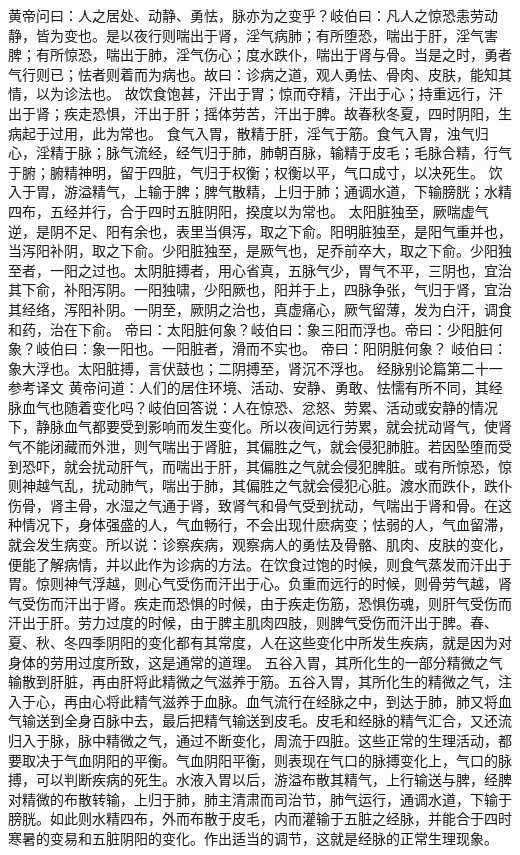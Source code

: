 \documentclass[a4paper,12pt,UTF8,twoside]{ctexbook}
\begin{document}
黄帝问曰：人之居处、动静、勇怯，脉亦为之变乎？岐伯曰：凡人之惊恐恚劳动静，皆为变也。是以夜行则喘出于肾，淫气病肺；有所堕恐，喘出于肝，淫气害脾；有所惊恐，喘出于肺，淫气伤心；度水跌仆，喘出于肾与骨。当是之时，勇者气行则已；怯者则着而为病也。故曰：诊病之道，观人勇怯、骨肉、皮肤，能知其情，以为诊法也。
故饮食饱甚，汗出于胃；惊而夺精，汗出于心；持重远行，汗出于肾；疾走恐惧，汗出于肝；摇体劳苦，汗出于脾。故春秋冬夏，四时阴阳，生病起于过用，此为常也。
食气入胃，散精于肝，淫气于筋。食气入胃，浊气归心，淫精于脉；脉气流经，经气归于肺，肺朝百脉，输精于皮毛；毛脉合精，行气于腑；腑精神明，留于四脏，气归于权衡；权衡以平，气口成寸，以决死生。
饮入于胃，游溢精气，上输于脾；脾气散精，上归于肺；通调水道，下输膀胱；水精四布，五经并行，合于四时五脏阴阳，揆度以为常也。
太阳脏独至，厥喘虚气逆，是阴不足、阳有余也，表里当俱泻，取之下俞。阳明脏独至，是阳气重并也，当泻阳补阴，取之下俞。少阳脏独至，是厥气也，足乔前卒大，取之下俞。少阳独至者，一阳之过也。太阴脏搏者，用心省真，五脉气少，胃气不平，三阴也，宜治其下俞，补阳泻阴。一阳独啸，少阳厥也，阳并于上，四脉争张，气归于肾，宜治其经络，泻阳补阴。一阴至，厥阴之治也，真虚痛心，厥气留薄，发为白汗，调食和药，治在下俞。
帝曰：太阳脏何象？岐伯曰：象三阳而浮也。帝曰：少阳脏何象？岐伯曰：象一阳也。一阳脏者，滑而不实也。
帝曰：阳阴脏何象？
岐伯曰：象大浮也。太阳脏搏，言伏鼓也；二阴搏至，肾沉不浮也。
经脉别论篇第二十一参考译文
黄帝问道：人们的居住环境、活动、安静、勇敢、怯懦有所不同，其经脉血气也随着变化吗？岐伯回答说：人在惊恐、忿怒、劳累、活动或安静的情况下，静脉血气都要受到影响而发生变化。所以夜间远行劳累，就会扰动肾气，使肾气不能闭藏而外泄，则气喘出于肾脏，其偏胜之气，就会侵犯肺脏。若因坠堕而受到恐吓，就会扰动肝气，而喘出于肝，其偏胜之气就会侵犯脾脏。或有所惊恐，惊则神越气乱，扰动肺气，喘出于肺，其偏胜之气就会侵犯心脏。渡水而跌仆，跌仆伤骨，肾主骨，水湿之气通于肾，致肾气和骨气受到扰动，气喘出于肾和骨。在这种情况下，身体强盛的人，气血畅行，不会出现什麽病变；怯弱的人，气血留滞，就会发生病变。所以说：诊察疾病，观察病人的勇怯及骨骼、肌肉、皮肤的变化，便能了解病情，并以此作为诊病的方法。在饮食过饱的时候，则食气蒸发而汗出于胃。惊则神气浮越，则心气受伤而汗出于心。负重而远行的时候，则骨劳气越，肾气受伤而汗出于肾。疾走而恐惧的时候，由于疾走伤筋，恐惧伤魂，则肝气受伤而汗出于肝。劳力过度的时候，由于脾主肌肉四肢，则脾气受伤而汗出于脾。春、夏、秋、冬四季阴阳的变化都有其常度，人在这些变化中所发生疾病，就是因为对身体的劳用过度所致，这是通常的道理。
五谷入胃，其所化生的一部分精微之气输散到肝脏，再由肝将此精微之气滋养于筋。五谷入胃，其所化生的精微之气，注入于心，再由心将此精气滋养于血脉。血气流行在经脉之中，到达于肺，肺又将血气输送到全身百脉中去，最后把精气输送到皮毛。皮毛和经脉的精气汇合，又还流归入于脉，脉中精微之气，通过不断变化，周流于四脏。这些正常的生理活动，都要取决于气血阴阳的平衡。气血阴阳平衡，则表现在气口的脉搏变化上，气口的脉搏，可以判断疾病的死生。水液入胃以后，游溢布散其精气，上行输送与脾，经脾对精微的布散转输，上归于肺，肺主清肃而司治节，肺气运行，通调水道，下输于膀胱。如此则水精四布，外而布散于皮毛，内而灌输于五脏之经脉，并能合于四时寒暑的变易和五脏阴阳的变化。作出适当的调节，这就是经脉的正常生理现象。
\end{document}
